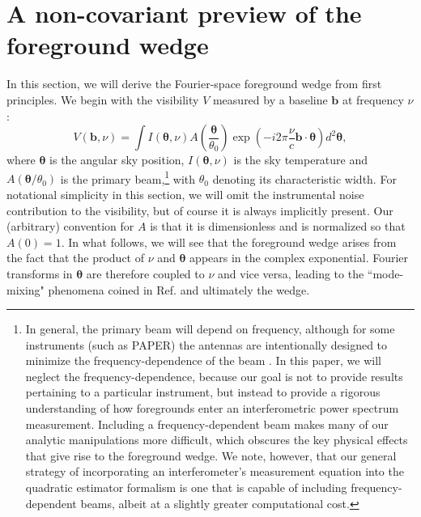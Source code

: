 \documentclass[twocolumn,aps,prd,nofootinbib,showpacs]{revtex4-1}
\begin{document}
\section{A non-covariant preview of the foreground wedge}
\label{sec:InstrumentResponse}
In this section, we will derive the Fourier-space foreground wedge from first principles.  We begin with the visibility $V$ measured by a baseline $\mathbf{b}$ at frequency $\nu$:
\begin{equation}
\label{eq:basicVis}
V(\mathbf{b}, \nu) = \int  I (\boldsymbol \theta, \nu)  A \left( \frac{\boldsymbol \theta}{\theta_0} \right)\exp \left( - i 2 \pi \frac{\nu}{c} \mathbf{b} \cdot \boldsymbol \theta \right)  d^2 \mathbf{\theta},
\end{equation}
where $\boldsymbol \theta$ is the angular sky position, $I (\boldsymbol \theta , \nu)$ is the sky temperature and $A(\boldsymbol \theta / \theta_0 )$ is the primary beam,\footnote{In general, the primary beam will depend on frequency, although for some instruments (such as PAPER) the antennas are intentionally designed to minimize the frequency-dependence of the beam \cite{Parsons2010}.  In this paper, we will neglect the frequency-dependence, because our goal is not to provide results pertaining to a particular instrument, but instead to provide a rigorous understanding of how foregrounds enter an interferometric power spectrum measurement.  Including a frequency-dependent beam makes many of our analytic manipulations more difficult, which obscures the key physical effects that give rise to the foreground wedge.  We note, however, that our general strategy of incorporating an interferometer's measurement equation into the quadratic estimator formalism is one that is capable of including frequency-dependent beams, albeit at a slightly greater computational cost.} with $\theta_0$ denoting its characteristic width.  For notational simplicity in this section, we will omit the instrumental noise contribution to the visibility, but of course it is always implicitly present.  Our (arbitrary) convention for $A$ is that it is dimensionless and is normalized so that $A(0)=1$.  In what follows, we will see that the foreground wedge arises from the fact that the product of $\nu$ and $\boldsymbol \theta$ appears in the complex exponential.  Fourier transforms in $\boldsymbol \theta$ are therefore coupled to $\nu$ and vice versa, leading to the ``mode-mixing" phenomena coined in Ref. \cite{Morales2012} and ultimately the wedge.
\end{document}
